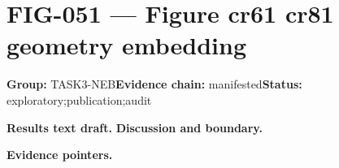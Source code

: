 \clearpage
\section{FIG-051 --- Figure cr61 cr81 geometry embedding}
\label{figpage:fig-051}
\textbf{Group:} TASK3-NEB\quad \textbf{Evidence chain:} manifested\quad \textbf{Status:} exploratory;publication;audit

\textbf{Results text draft.} 
\textbf{Discussion and boundary.} 


\textbf{Evidence pointers.}



\vfill
